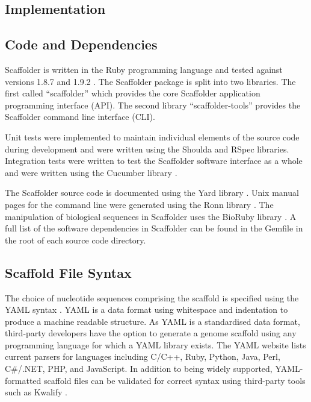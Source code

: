 \documentclass[10pt]{bmc_article}
\newenvironment{bmcformat}{\begin{raggedright}\baselineskip20pt\sloppy\setboolean{publ}{false}}{\end{raggedright}\baselineskip20pt\sloppy}
\begin{document}
\begin{bmcformat}
\clearpage

\section*{Implementation} %

\subsection*{Code and Dependencies} %

Scaffolder is written in the Ruby programming language and tested against
versions 1.8.7 and 1.9.2 \cite{ruby-lang}. The Scaffolder package is split into
two libraries. The first called ``scaffolder'' which provides the core
Scaffolder application programming interface (API). The second library
``scaffolder-tools'' provides the Scaffolder command line interface (CLI). \pb

Unit tests were implemented to maintain individual elements of the source code
during development and were written using the Shoulda and RSpec \cite{rspec}
libraries. Integration tests were written to test the Scaffolder software
interface as a whole and were written using the Cucumber library \cite{rspec}.
\pb

The Scaffolder source code is documented using the Yard library \cite{yard}.
Unix manual pages for the command line were generated using the Ronn library
\cite{ronn}. The manipulation of biological sequences in Scaffolder uses the
BioRuby library \cite{goto2010}. A full list of the software dependencies in
Scaffolder can be found in the Gemfile in the root of each source code
directory. \pb

\subsection*{Scaffold File Syntax} %

The choice of nucleotide sequences comprising the scaffold is specified using
the YAML syntax \cite{yaml}. YAML is a data format using whitespace and
indentation to produce a machine readable structure. As YAML is a standardised
data format, third-party developers have the option to generate a genome
scaffold using any programming language for which a YAML library exists. The
YAML website lists current parsers for languages including C/C++, Ruby, Python,
Java, Perl, C\#/.NET, PHP, and JavaScript. In addition to being widely
supported, YAML-formatted scaffold files can be validated for correct syntax
using third-party tools such as Kwalify \cite{kwalify}. \pb


\end{bmcformat}
\end{document}
